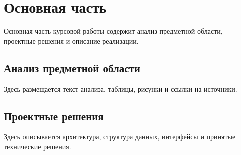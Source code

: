 \section{Основная часть}

Основная часть курсовой работы содержит анализ предметной области, проектные решения и описание реализации.

\subsection{Анализ предметной области}

Здесь размещается текст анализа, таблицы, рисунки и ссылки на источники.

\subsection{Проектные решения}

Здесь описывается архитектура, структура данных, интерфейсы и принятые технические решения.
